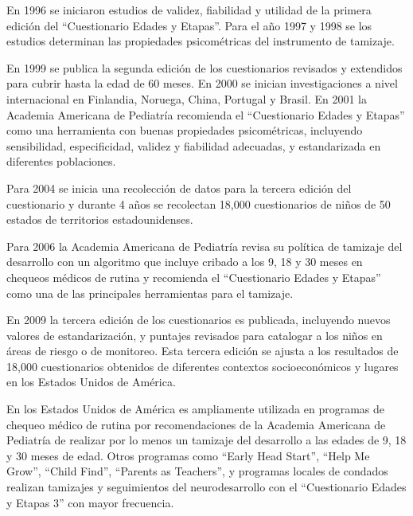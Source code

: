 \documentclass[11pt,letterpaper]{report}
\begin{document}
En 1996 se iniciaron estudios de validez, fiabilidad y utilidad de la primera
edición del ``Cuestionario Edades y Etapas''. Para el año 1997 y 1998 se los
estudios determinan las propiedades psicométricas del instrumento de tamizaje.
\cite{ASQ4decades}

En 1999 se publica la segunda edición de los cuestionarios revisados y
extendidos para cubrir hasta la edad de 60 meses. En 2000 se inician
investigaciones a nivel internacional en Finlandia, Noruega, China, Portugal y
Brasil. En 2001 la Academia Americana de Pediatría recomienda el ``Cuestionario
Edades y Etapas'' como una herramienta con buenas propiedades psicométricas,
incluyendo sensibilidad, especificidad, validez y fiabilidad adecuadas, y
estandarizada en diferentes poblaciones. \cite{Pediatrics2001}

Para 2004 se inicia una recolección de datos para la tercera edición del
cuestionario y durante 4 años se recolectan 18,000 cuestionarios de niños de 50
estados de territorios estadounidenses. \cite{ASQ4decades}

Para 2006 la Academia Americana de Pediatría revisa su política de tamizaje del
desarrollo con un algoritmo que incluye cribado a los 9, 18 y 30 meses en
chequeos médicos de rutina y recomienda el ``Cuestionario Edades y Etapas''
como una de las principales herramientas para el tamizaje.
\cite{Pediatrics2006}
 
En 2009 la tercera edición de los cuestionarios es publicada, incluyendo nuevos
valores de estandarización, y puntajes revisados para catalogar a los niños en
áreas de riesgo o de monitoreo. Esta tercera edición se ajusta a los resultados
de 18,000 cuestionarios obtenidos de diferentes contextos socioeconómicos y
lugares en los Estados Unidos de América. \cite{ASQ4decades}

En los Estados Unidos de América es ampliamente utilizada en programas de
chequeo médico de rutina por recomendaciones de la Academia Americana de
Pediatría de realizar por lo menos un tamizaje del desarrollo a las edades de
9, 18 y 30 meses de edad. Otros programas como ``Early Head Start'', ``Help Me
Grow'', ``Child Find'', ``Parents as Teachers'', y programas locales de
condados realizan tamizajes y seguimientos del neurodesarrollo con el
``Cuestionario Edades y Etapas 3'' con mayor frecuencia. \cite{ASQWorld}
\end{document}
